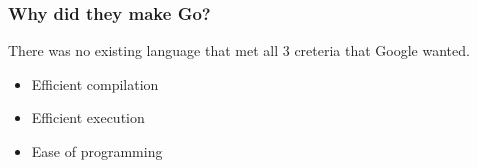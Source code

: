 \documentclass{beamer}
\begin{document}
\begin{frame}
  \frametitle{Why did they make Go?}

  There was no existing language that met all 3 creteria that Google
  wanted.
  
  \begin{itemize}
    \item Efficient compilation
    \item Efficient execution
    \item Ease of programming
  \end{itemize}
\end{frame}
\end{document}
